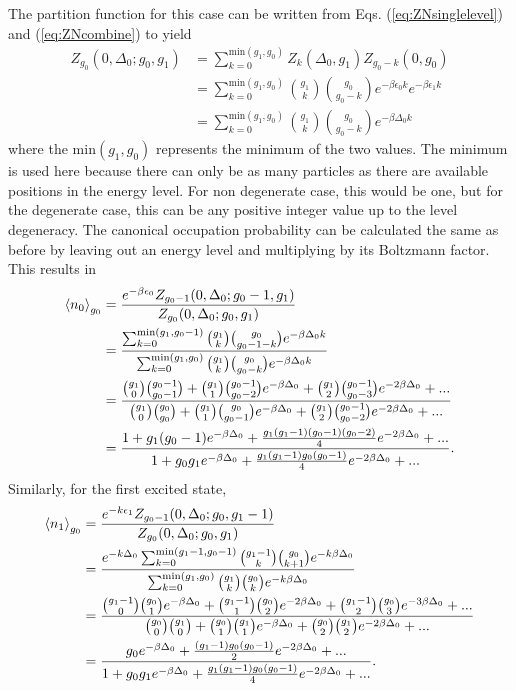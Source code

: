 The partition function for this case can be written from Eqs. (\ref{eq:ZNsinglelevel}) and (\ref{eq:ZNcombine}) to yield
\begin{align}
    Z_{g_0}(0,\Delta_0;g_0,g_1)&=\sum_{k=0}^{\text{min}(g_1,g_0)} Z_k(\Delta_0,g_1)Z_{g_0-k}(0,g_0)\nonumber\\
    &=\sum_{k=0}^{\text{min}(g_1,g_0)} {g_1 \choose k}{g_0\choose g_0-k} e^{-\beta \epsilon_0 k}e^{-\beta \epsilon_1 k}\nonumber\\
    &=\sum_{k=0}^{\text{min}(g_1,g_0)} {g_1 \choose k}{g_0\choose g_0-k} e^{-\beta \Delta_0 k}
\end{align}
where the $\text{min}(g_1,g_0)$ represents the minimum of the two values. The minimum is used here because there can only be as many particles as there are available positions in the energy level. For non degenerate case, this would be one, but for the degenerate case, this can be any positive integer value up to the level degeneracy. The canonical occupation probability can be calculated the same as before by leaving out an energy level and multiplying by its Boltzmann factor. This results in 
\begin{align}
    \left<{n_0}\right>_{g_0}&=\frac{e^{-\beta \epsilon_0}Z_{g_0-1}(0,\Delta_0;g_0-1,g_1)}{Z_{g_0}(0,\Delta_0;g_0,g_1)}\nonumber\\
    &=\frac{\sum_{k=0}^{\text{min}(g_1,g_0-1)} {g_1 \choose k}{g_0\choose g_0-1-k} e^{-\beta \Delta_0 k}}{\sum_{k=0}^{\text{min}(g_1,g_0)} {g_1 \choose k}{g_0\choose g_0-k} e^{-\beta \Delta_0 k }}\nonumber\\
    &=\frac{{g_1\choose 0}{g_0-1\choose g_0-1}+{g_1 \choose 1}{g_0-1\choose g_0-2}e^{-\beta\Delta_0}+{g_1\choose 2}{g_0-1\choose g_0-3}e^{-2\beta\Delta_0}+...}{{g_1\choose 0}{g_0\choose g_0}+{g_1 \choose 1}{g_0\choose g_0-1}e^{-\beta\Delta_0}+{g_1\choose 2}{g_0-1\choose g_0-2}e^{-2\beta\Delta_0}+...}\nonumber\\
    &=\frac{1+g_1(g_0-1)e^{-\beta\Delta_0}+\frac{g_1(g_1-1)(g_0-1)(g_0-2)}{4}e^{-2\beta\Delta_0}+...}{1+g_0g_1e^{-\beta\Delta_0}+\frac{g_1(g_1-1)g_0(g_0-1)}{4}e^{-2\beta\Delta_0}+...}. \label{2.20}
\end{align}
Similarly, for the first excited state,
\begin{align}
    \left<{n_1}\right>_{g_0}&=\frac{e^{-k\epsilon_1} Z_{g_0-1}(0,\Delta_0;g_0,g_1-1)}{Z_{g_0}(0,\Delta_0;g_0,g_1)}\nonumber\\
    &=\frac{e^{-k\Delta_0}\sum_{k=0}^{\text{min}(g_1-1,g_0-1)} {g_1-1\choose k}{g_0 \choose k+1} e^{-k\beta\Delta_0}}{\sum_{k=0}^{\text{min}(g_1,g_0)} {g_1\choose k}{g_0 \choose k} e^{-k\beta\Delta_0}}\nonumber\\
    &=\frac{{g_1-1\choose 0}{g_0\choose 1} e^{-\beta\Delta_0} +{g_1-1\choose 1}{g_0\choose 2} e^{-2\beta\Delta_0}+{g_1-1\choose 2}{g_0\choose 3}e^{-3\beta\Delta_0}+...}{{g_0\choose 0}{g_1\choose 0}+{g_0\choose 1}{g_1\choose 1}e^{-\beta\Delta_0}+{g_0\choose 2}{g_1\choose 2}e^{-2\beta\Delta_0}+...}\nonumber\\
    &=\frac{g_0e^{-\beta\Delta_0}+\frac{(g_1-1)g_0(g_0-1)}{2}e^{-2\beta\Delta_0}+...}{1+g_0g_1 e^{-\beta\Delta_0}+\frac{g_1(g_1-1)g_0(g_0-1)}{4}e^{-2\beta\Delta_0}+...}.
\end{align} 
